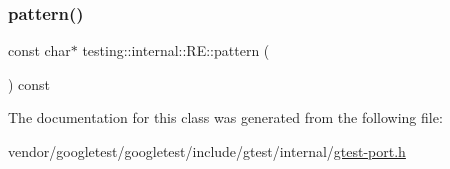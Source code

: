 \subsubsection{\texorpdfstring{pattern()}{pattern()}}
{\footnotesize\ttfamily const char$\ast$ testing\+::internal\+::\+R\+E\+::pattern (\begin{DoxyParamCaption}{ }\end{DoxyParamCaption}) const\hspace{0.3cm}{\ttfamily [inline]}}



The documentation for this class was generated from the following file\+:\begin{DoxyCompactItemize}
\item 
vendor/googletest/googletest/include/gtest/internal/\hyperlink{gtest-port_8h}{gtest-\/port.\+h}\end{DoxyCompactItemize}
